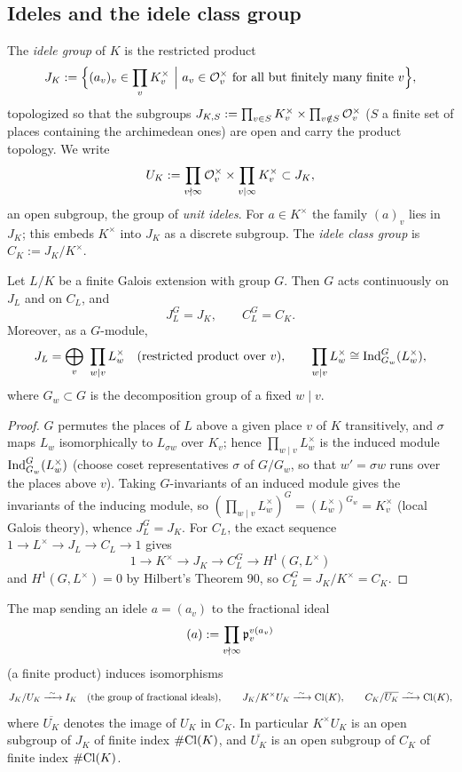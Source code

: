 \subsection{Ideles and the idele class group}

\begin{definition}
\label{idele-group}
The \emph{idele group} of $K$ is the restricted product
$$J_K:=\Big\{(a_v)_v\in\prod_vK_v^\times\ \Big|\
a_v\in{\mathcal {O}}_v^\times\text{ for all but finitely many finite }v\Big\},$$
topologized so that the subgroups
$J_{K,S}:=\prod_{v\in S}K_v^\times\times\prod_{v\notin S}{\mathcal {O}}_v^\times$
($S$ a finite set of places containing the archimedean ones) are open and carry
the product topology.
We write
$$U_K:=\prod_{v\nmid\infty}{\mathcal {O}}_v^\times\times\prod_{v\mid\infty}K_v^\times
\subset J_K,$$
an open subgroup, the group of \emph{unit ideles}.
For $a\in K^\times$ the family $(a)_v$ lies in $J_K$; this embeds $K^\times$ into
$J_K$ as a discrete subgroup.
The \emph{idele class group} is $C_K:=J_K/K^\times$.
\end{definition}

\begin{prop}
\label{idele-class-group-galois}
Let $L/K$ be a finite Galois extension with group $G$.
Then $G$ acts continuously on $J_L$ and on $C_L$, and
$$J_L^G=J_K,\qquad C_L^G=C_K .$$
Moreover, as a $G$-module,
$$J_L=\bigoplus_{v}\ \prod_{w\mid v}L_w^\times
\quad\text{(restricted product over }v\text{)},\qquad
\prod_{w\mid v}L_w^\times\cong{\mathrm{Ind}}_{G_w}^G(L_w^\times),$$
where $G_w\subset G$ is the decomposition group of a fixed $w\mid v$.
\end{prop}

\begin{proof}
$G$ permutes the places of $L$ above a given place $v$ of $K$ transitively, and
$\sigma$ maps $L_w$ isomorphically to $L_{\sigma w}$ over $K_v$; hence
$\prod_{w\mid v}L_w^\times$ is the induced module ${\mathrm{Ind}}_{G_w}^G(L_w^\times)$
(choose coset representatives $\sigma$ of $G/G_w$, so that $w'=\sigma w$ runs
over the places above $v$).
Taking $G$-invariants of an induced module gives the invariants of the inducing
module, so $(\prod_{w\mid v}L_w^\times)^G=(L_w^\times)^{G_w}=K_v^\times$
(local Galois theory), whence $J_L^G=J_K$.
For $C_L$, the exact sequence $1\to L^\times\to J_L\to C_L\to 1$ gives
$$1\to K^\times\to J_K\to C_L^G\to H^1(G,L^\times)$$
and $H^1(G,L^\times)=0$ by Hilbert's Theorem 90, so $C_L^G=J_K/K^\times=C_K$.
\end{proof}

\begin{prop}
\label{idele-class-group-and-class-group}
The map sending an idele $a=(a_v)$ to the fractional ideal
$$(a):=\prod_{v\nmid\infty}{\mathfrak{p}}_v^{v(a_v)}$$
(a finite product) induces isomorphisms
$$J_K/U_K\xrightarrow{\ \sim\ }I_K\quad\text{(the group of fractional ideals)},
\qquad
J_K/K^\times U_K\xrightarrow{\ \sim\ }{\mathrm{Cl}}(K),\qquad
C_K/\overline{U_K}\xrightarrow{\ \sim\ }{\mathrm{Cl}}(K),$$
where $\overline{U_K}$ denotes the image of $U_K$ in $C_K$.
In particular $K^\times U_K$ is an open subgroup of $J_K$ of finite index
$\#{\mathrm{Cl}}(K)$, and $\overline{U_K}$ is an open subgroup of $C_K$ of finite index
$\#{\mathrm{Cl}}(K)$.
\end{prop}

